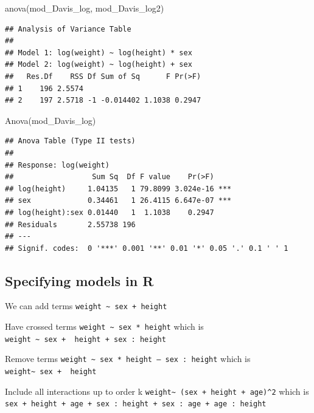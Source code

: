 \documentclass[
]{book}
\newenvironment{Shaded}{\begin{snugshade}}{\end{snugshade}}
\newcommand{\FunctionTok}[1]{\textcolor[rgb]{0.00,0.00,0.00}{#1}}
\newcommand{\NormalTok}[1]{#1}
\begin{document}
\begin{Shaded}
\begin{Highlighting}[]
\FunctionTok{anova}\NormalTok{(mod\_Davis\_log, mod\_Davis\_log2)}
\end{Highlighting}
\end{Shaded}

\begin{verbatim}
## Analysis of Variance Table
## 
## Model 1: log(weight) ~ log(height) * sex
## Model 2: log(weight) ~ log(height) + sex
##   Res.Df    RSS Df Sum of Sq      F Pr(>F)
## 1    196 2.5574                           
## 2    197 2.5718 -1 -0.014402 1.1038 0.2947
\end{verbatim}

\begin{Shaded}
\begin{Highlighting}[]
\FunctionTok{Anova}\NormalTok{(mod\_Davis\_log)}
\end{Highlighting}
\end{Shaded}

\begin{verbatim}
## Anova Table (Type II tests)
## 
## Response: log(weight)
##                  Sum Sq  Df F value    Pr(>F)    
## log(height)     1.04135   1 79.8099 3.024e-16 ***
## sex             0.34461   1 26.4115 6.647e-07 ***
## log(height):sex 0.01440   1  1.1038    0.2947    
## Residuals       2.55738 196                      
## ---
## Signif. codes:  0 '***' 0.001 '**' 0.01 '*' 0.05 '.' 0.1 ' ' 1
\end{verbatim}

\hypertarget{specifying-models-in-r}{%
\subsection{Specifying models in R}\label{specifying-models-in-r}}

We can add terms
\texttt{weight\ \textasciitilde{}\ sex\ +\ height}

Have crossed terms
\texttt{weight\ \textasciitilde{}\ sex\ *\ height} which is \texttt{weight\ \textasciitilde{}\ sex\ +\ \ height\ +\ sex\ :\ height}

Remove terms
\texttt{weight\ \textasciitilde{}\ sex\ *\ height\ –\ sex\ :\ height} which is \texttt{weight\textasciitilde{}\ sex\ +\ \ height}

Include all interactions up to order k
\texttt{weight\textasciitilde{}\ (sex\ +\ height\ +\ age)\^{}2} which is \texttt{sex\ +\ height\ +\ age\ +\ sex\ :\ height\ +\ sex\ :\ age\ +\ age\ :\ height}
\end{document}
